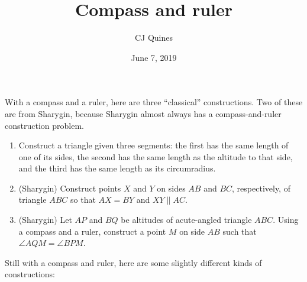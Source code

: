 \documentclass[11pt,paper=letter]{scrartcl}
\begin{document}
\title{Compass and ruler}
\author{CJ Quines}
\date{June 7, 2019}

\maketitle

\noindent With a compass and a ruler, here are three ``classical'' constructions. Two of these are from Sharygin, because Sharygin almost always has a compass-and-ruler construction problem.

\begin{enumerate}
  \item Construct a triangle given three segments: the first has the same length of one of its sides, the second has the same length as the altitude to that side, and the third has the same length as its circumradius. %

  \item (Sharygin) Construct points $X$ and $Y$ on sides $AB$ and $BC$, respectively, of triangle $ABC$ so that $AX = BY$ and $XY \parallel AC$.%

  \item (Sharygin) Let $AP$ and $BQ$ be altitudes of acute-angled triangle $ABC$. Using a compass and a ruler, construct a point $M$ on side $AB$ such that $\angle AQM = \angle BPM$. %
\end{enumerate}

\noindent Still with a compass and ruler, here are some slightly different kinds of constructions:
\end{document}
